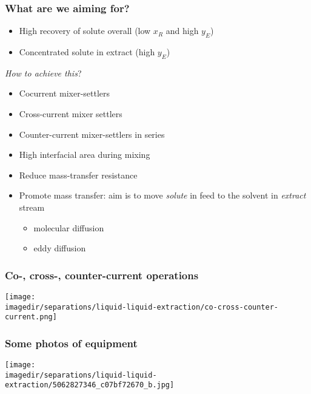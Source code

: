 \begin{frame}\frametitle{What are we aiming for?}
	\begin{exampleblock}{{\color{myRed}{Main aims}}}
		\begin{itemize}
			\item	High recovery of solute overall (low $x_R$ and high $y_E$)
			\item	Concentrated solute in extract (high $y_E$)
		\end{itemize}
	\end{exampleblock}
	\vspace{12pt}
	\emph{How to achieve this}?
	\begin{itemize}
		\item	Cocurrent mixer-settlers
		\item	Cross-current mixer settlers
		\item	Counter-current mixer-settlers in series
		\item	High interfacial area during mixing
		\item	Reduce mass-transfer resistance
		\item	Promote mass transfer: aim is to move \emph{solute} in feed to the solvent in \emph{extract} stream
		\begin{itemize}
			\item	molecular diffusion \hfill {\color{myOrange}{$\leftarrow$ microscopic movement}}
			\item	eddy diffusion  \hfill {\color{myOrange}{$\leftarrow$ orders of magnitude greater}}
		\end{itemize}
	\end{itemize}
\end{frame}

\begin{frame}\frametitle{Co-, cross-, counter-current operations}
	\begin{center}
		\texttt{[image: \\imagedir/separations/liquid-liquid-extraction/co-cross-counter-current.png]}
	\end{center}
	
\end{frame}

\begin{frame}\frametitle{Some photos of equipment}
	\begin{center}
		\texttt{[image: \\imagedir/separations/liquid-liquid-extraction/5062827346\_c07bf72670\_b.jpg]}
	\end{center}
\end{frame}

